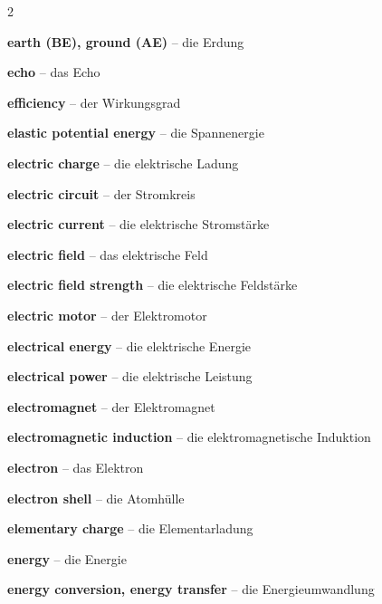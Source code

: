 \begin{multicols}{2}
\par\nopagebreak
\textbf{earth (BE), ground (AE)} -- die Erdung\dotfill\hyperref[e:189]{\pageref*{e:189}}\par
\textbf{echo} -- das Echo\dotfill\hyperref[e:217]{\pageref*{e:217}}\par
\textbf{efficiency} -- der Wirkungsgrad\dotfill\hyperref[e:106]{\pageref*{e:106}}\par
\textbf{elastic potential energy} -- die Spannenergie\dotfill\hyperref[e:99]{\pageref*{e:99}}\par
\textbf{electric charge} -- die elektrische Ladung\dotfill\hyperref[e:143]{\pageref*{e:143}}\par
\textbf{electric circuit} -- der Stromkreis\dotfill\hyperref[e:153]{\pageref*{e:153}}\par
\textbf{electric current} -- die elektrische Stromstärke\dotfill\hyperref[e:144]{\pageref*{e:144}}\par
\textbf{electric field} -- das elektrische Feld\dotfill\hyperref[e:171]{\pageref*{e:171}}\par
\textbf{electric field strength} -- die elektrische Feldstärke\dotfill\hyperref[e:172]{\pageref*{e:172}}\par
\textbf{electric motor} -- der Elektromotor\dotfill\hyperref[e:186]{\pageref*{e:186}}\par
\textbf{electrical energy} -- die elektrische Energie\dotfill\hyperref[e:101]{\pageref*{e:101}}\par
\textbf{electrical power} -- die elektrische Leistung\dotfill\hyperref[e:168]{\pageref*{e:168}}\par
\textbf{electromagnet} -- der Elektromagnet\dotfill\hyperref[e:176]{\pageref*{e:176}}\par
\textbf{electromagnetic induction} -- die elektromagnetische Induktion\dotfill\hyperref[e:184]{\pageref*{e:184}}\par
\textbf{electron} -- das Elektron\dotfill\hyperref[e:262]{\pageref*{e:262}}\par
\textbf{electron shell} -- die Atomhülle\dotfill\hyperref[e:261]{\pageref*{e:261}}\par
\textbf{elementary charge} -- die Elementarladung\dotfill\hyperref[e:266]{\pageref*{e:266}}\par
\textbf{energy} -- die Energie\dotfill\hyperref[e:95]{\pageref*{e:95}}\par
\textbf{energy conversion, energy transfer} -- die Energieumwandlung\dotfill\hyperref[e:103]{\pageref*{e:103}}\par

\end{multicols}

